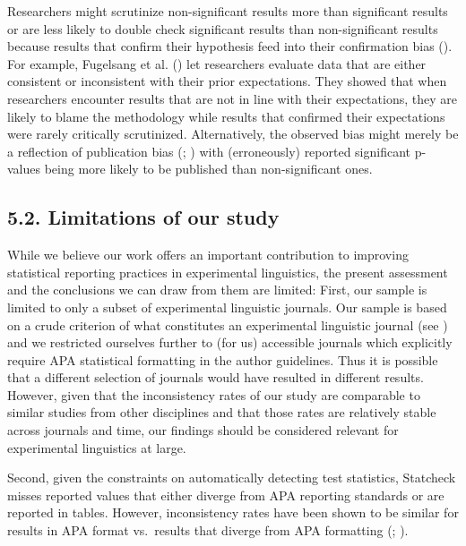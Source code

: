 \documentclass[
  doc,
  longtable,
  nolmodern,
  notxfonts,
  notimes,
  colorlinks=true,linkcolor=blue,citecolor=blue,urlcolor=blue]{apa7}
\begin{document}
Researchers might scrutinize non-significant results more than
significant results or are less likely to double check significant
results than non-significant results because results that confirm their
hypothesis feed into their confirmation bias
(). For
example, Fugelsang et al. () let
researchers evaluate data that are either consistent or inconsistent
with their prior expectations. They showed that when researchers
encounter results that are not in line with their expectations, they are
likely to blame the methodology while results that confirmed their
expectations were rarely critically scrutinized. Alternatively, the
observed bias might merely be a reflection of publication bias
(;
) with
(erroneously) reported significant p-values being more likely to be
published than non-significant ones.

\subsection{5.2. Limitations of our
study}\label{limitations-of-our-study}

While we believe our work offers an important contribution to improving
statistical reporting practices in experimental linguistics, the present
assessment and the conclusions we can draw from them are limited: First,
our sample is limited to only a subset of experimental linguistic
journals. Our sample is based on a crude criterion of what constitutes
an experimental linguistic journal (see
) and we
restricted ourselves further to (for us) accessible journals which
explicitly require APA statistical formatting in the author guidelines.
Thus it is possible that a different selection of journals would have
resulted in different results. However, given that the inconsistency
rates of our study are comparable to similar studies from other
disciplines and that those rates are relatively stable across journals
and time, our findings should be considered relevant for experimental
linguistics at large.

Second, given the constraints on automatically detecting test
statistics, Statcheck misses reported values that either diverge from
APA reporting standards or are reported in tables. However,
inconsistency rates have been shown to be similar for results in APA
format vs.~results that diverge from APA formatting
(;
).
\end{document}
